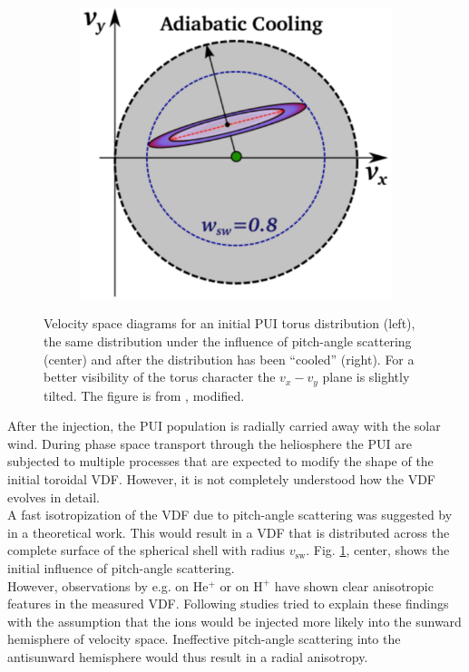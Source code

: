 \begin{figure}
\begin{subfigure}{.32\textwidth}
	\end{subfigure}
	\begin{subfigure}{.32\textwidth}
		\centering
		\includegraphics[width=1.\linewidth]{Figures/Cooling.pdf}
	\end{subfigure}
	\caption{Velocity space diagrams for an initial PUI torus distribution (left), the same distribution under the influence of pitch-angle scattering (center) and after the distribution has been ``cooled'' (right). For a better visibility of the torus character the $v_x-v_y$ plane is slightly tilted. The figure is from \citet{drews_2015}, modified.}
	\label{fig:pu}
\end{figure}
After the injection, the PUI population is radially carried away with the solar wind. During phase space transport through the heliosphere the PUI are subjected to multiple processes that are expected to modify the shape of the initial toroidal VDF. However, it is not completely understood how the VDF evolves in detail.
\\
A fast isotropization of the VDF due to pitch-angle scattering was suggested by \citet{vasyl_siscoe_1976} in a theoretical work. This would result in a VDF that is distributed across the complete surface of the spherical shell with radius $v_{\mathrm{sw}}$. Fig. \ref{fig:pu}, center, shows the initial influence of pitch-angle scattering. \\
However, observations by e.g. \citet{moebius_98} on $\mathrm{He^{+}}$ or \citet{gloeckler_1995} on $\mathrm{H^{+}}$ have shown clear anisotropic features in the measured VDF. Following studies \citep[e.g.][]{isenberg} tried to explain these findings with the assumption that the ions would be injected more likely into the sunward hemisphere of velocity space. Ineffective pitch-angle scattering into the antisunward hemisphere would thus result in a radial anisotropy.
